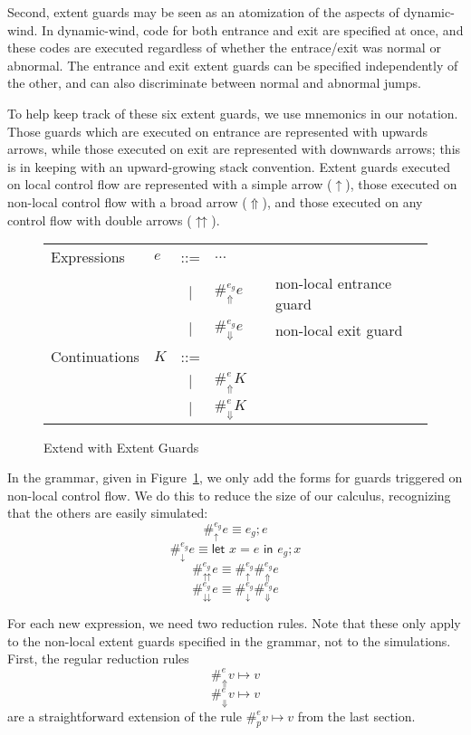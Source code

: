 \documentclass[11pt]{article}
\newcommand{\letin}[2]{\textsf{let }#1\textsf{ in }#2}
\begin{document}
Second, extent guards may be seen as an atomization of the aspects of dynamic-wind.
In dynamic-wind, code for both entrance and exit are specified at once, and these codes are executed regardless of whether the entrace/exit was normal or abnormal.
The entrance and exit extent guards can be specified independently of the other, and can also discriminate between normal and abnormal jumps.

To help keep track of these six extent guards, we use mnemonics in our notation.
Those guards which are executed on entrance are represented with upwards arrows, while those executed on exit are represented with downwards arrows; this is in keeping with an upward-growing stack convention.
Extent guards executed on local control flow are represented with a simple arrow ($\uparrow$), those executed on non-local control flow with a broad arrow ($\Uparrow$), and those executed on any control flow with double arrows ($\upuparrows$).

\begin{figure}[H]
\caption{Extend with Extent Guards}
\label{fig:addGuards}

\renewcommand{\arraystretch}{1.5}
\begin{tabular}{llclll}
Expressions & $e$ & ::= & $\ldots$ &  \\
& & $|$ & $\#_\Uparrow^{e_g}e$ && non-local entrance guard \\
& & $|$ & $\#_\Downarrow^{e_g}e$ && non-local exit guard \\
Continuations & $K$ & ::= & \\
& & $|$ & $\#_{\Uparrow}^{e}K$ &&  \\
& & $|$ & $\#_{\Downarrow}^{e}K$ &&  \\
\end{tabular}
\end{figure}

In the grammar, given in Figure~\ref{fig:addGuards}, we only add the forms for guards triggered on non-local control flow.
We do this to reduce the size of our calculus, recognizing that the others are easily simulated:
$$\#_\uparrow^{e_g}e \equiv e_g; e$$
$$\#_\downarrow^{e_g}e \equiv \letin{x=e}{e_g; x}$$
$$\#_\upuparrows^{e_g}e \equiv \#_\uparrow^{e_g}\#_\Uparrow^{e_g}e$$
$$\#_\downdownarrows^{e_g}e \equiv \#_\downarrow^{e_g}\#_\Downarrow^{e_g}e$$


For each new expression, we need two reduction rules.
Note that these only apply to the non-local extent guards specified in the grammar, not to the simulations.
First, the regular reduction rules
$$\#_{\Uparrow}^{e}v \mapsto v$$
$$\#_{\Downarrow}^{e}v \mapsto v$$
are a straightforward extension of the rule $\#_{p}^{e}v \mapsto v$ from the last section.
\end{document}
